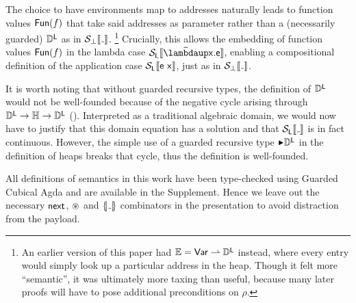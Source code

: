 The choice to have environments map to addresses naturally leads to function
values $\mathsf{Fun}(f)$ that take said addresses as parameter rather than a
(necessarily guarded) ${\mathbb{D}^{\mathop{\mathsf{L}}}}$ as in $\semscott{\wild}$.%
\footnote{An earlier version of this paper had
$\mathbb{E} = \mathsf{Var} \rightharpoonup {\mathbb{D}^{\mathop{\mathsf{L}}}}$ instead, where every entry would simply look
up a particular address in the heap.
Though it felt more ``semantic'', it was ultimately more taxing than useful,
because many later proofs will have to pose additional preconditions on $ρ$.}
Crucially, this allows the embedding of function values $\mathsf{Fun}(f)$ in the
lambda case $\semvan{\Lam{\px}{\pe}}$, enabling a compositional definition of the
application case $\mathcal{S}_{\mathop{\mathsf{L}}}\llbracket {\mathsf{e}~\mathsf{x}} \rrbracket$, just as in $\semscott{\wild}$.

It is worth noting that without guarded recursive types, the definition of
${\mathbb{D}^{\mathop{\mathsf{L}}}}$ would not be well-founded because of the negative cycle arising through
${\mathbb{D}^{\mathop{\mathsf{L}}}} \to \mathbb{H} \to {\mathbb{D}^{\mathop{\mathsf{L}}}}$ (\cf {}).
Interpreted as a traditional algebraic domain, we would now have to justify
that this domain equation has a solution and that $\semvan{\wild}$ is in fact
continuous.
However, the simple use of a guarded recursive type $\later \VanD$ in the
definition of heaps breaks that cycle, thus the definition is well-founded.

All definitions of semantics in this work have been type-checked using Guarded
Cubical Agda and are available in the Supplement.
Hence we leave out the necessary $\mathop{\mathsf{next}}$, $\mathbin{\circledast}$ and $\idiom{\wild}$
combinators in the presentation to avoid distraction from the payload.


